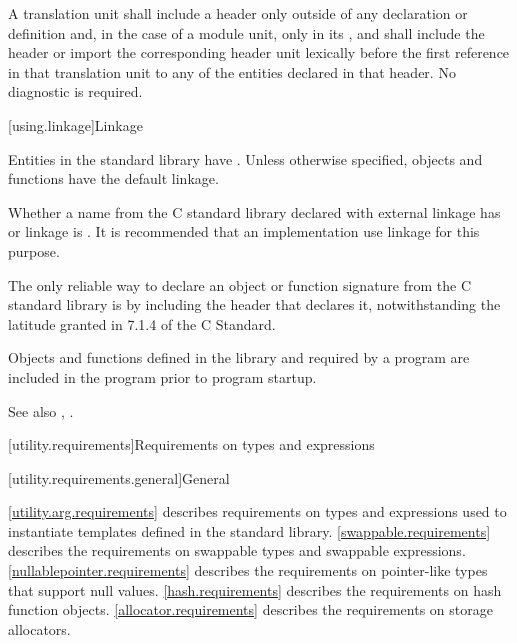 \pnum
A translation unit shall include a header only outside of any
%
declaration or definition and,
in the case of a module unit,
only in its , and
shall include the header or import the corresponding header unit lexically
before the first reference in that translation unit to any of the entities
declared in that header. No diagnostic is required.

[using.linkage]{Linkage}

\pnum
Entities in the \Cpp{} standard library have .
Unless otherwise specified, objects and functions have the default
linkage.

\pnum
{}%
Whether a name from the C standard library declared with
external linkage has
%
%
%
or
%
linkage is . It is recommended that an
implementation use
linkage for this purpose.
\begin{footnote}
The only reliable way to declare an object or
function signature from the C standard library is by including the header that
declares it, notwithstanding the latitude granted in 7.1.4 of the C
Standard.
\end{footnote}

\pnum
Objects and functions
defined in the library and required by a \Cpp{} program are included in
the program prior to program startup.

%
\pnum
See also
,
.

[utility.requirements]{Requirements on types and expressions}

[utility.requirements.general]{General}

\pnum
\ref{utility.arg.requirements}
describes requirements on types and expressions used to instantiate templates
defined in the \Cpp{} standard library.
\ref{swappable.requirements} describes the requirements on swappable types and
swappable expressions.
\ref{nullablepointer.requirements} describes the requirements on pointer-like
types that support null values.
\ref{hash.requirements} describes the requirements on hash function objects.
\ref{allocator.requirements} describes the requirements on storage
allocators.

